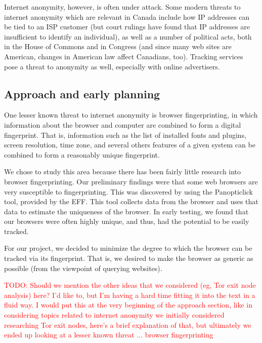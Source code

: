 \documentclass[12pt,a4paper]{article}
\begin{document}
Internet anonymity, however, is often under attack. Some modern threats to internet anonymity which are relevant in Canada include how IP addresses can be tied to an ISP customer (but court rulings have found that IP addresses are insufficient to identify an individual), as well as a number of political acts, both in the House of Commons and in Congress (and since many web sites are American, changes in American law affect Canadians, too). Tracking services pose a threat to anonymity as well, especially with online advertisers.

\subsection{Approach and early planning}
One lesser known threat to internet anonymity is browser fingerprinting, in which information about the browser and computer are combined to form a digital fingerprint. That is, information such as the list of installed fonts and plugins, screen resolution, time zone, and several others features of a given system can be combined to form a reasonably unique fingerprint.

We chose to study this area because there has been fairly little research into browser fingerprinting. Our preliminary findings were that some web browsers are very susceptible to fingerprinting. This was discovered by using the Panopticlick\cite{panopticlick} tool, provided by the EFF. This tool collects data from the browser and uses that data to estimate the uniqueness of the browser. In early testing, we found that our browsers were often highly unique, and thus, had the potential to be easily tracked.

For our project, we decided to minimize the degree to which the browser can be tracked via its fingerprint. That is, we desired to make the browser as generic as possible (from the viewpoint of querying websites).

\textcolor{red}{TODO: Should we mention the other ideas that we considered (eg, Tor exit node analysis) here? I'd like to, but I'm having a hard time fitting it into the text in a fluid way. I would put this at the very beginning of the approach section, like in considering topics related to internet anonymity we initially considered researching Tor exit nodes, here's a brief explanation of that, but ultimately we ended up looking at a lesser known threat ... browser fingerprinting}
\end{document}
